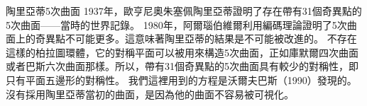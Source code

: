 \begin{surferPage}{陶里亞蒂5次曲面}
1937年，歐亨尼奧朱塞佩陶里亞蒂證明了存在帶有31個奇異點的5次曲面——當時的世界記錄。
1980年，阿爾瑙伯維爾利用編碼理論證明了5次曲面上的奇異點不可能更多。這意味著陶里亞蒂的結果是不可能被改進的。
不存在這樣的柏拉圖環體，它的對稱平面可以被用來構造5次曲面，正如庫默爾四次曲面或者巴斯六次曲面那樣。所以，帶有31個奇異點的5次曲面具有較少的對稱性，即只有平面五邊形的對稱性。
我們這裡用到的方程是沃爾夫巴斯（1990）發現的。沒有採用陶里亞蒂當初的曲面，是因為他的曲面不容易被可視化。
\end{surferPage}
